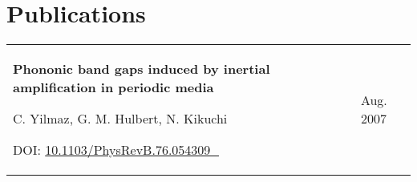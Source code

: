\documentclass[10pt, a4paper]{article}
\let\hrefWithoutArrow\href
\renewcommand{\href}[2]{\hrefWithoutArrow{#1}{#2\, \raisebox{.1ex}{\footnotesize \faExternalLink*}}}
\begin{document}
    \section{Publications}
    
        \begin{tabularx}{ cm-0.13cm}{K{0.2 cm} R{3.6 cm}}
            \textbf{Phononic band gaps induced by inertial amplification in periodic media}

            \vspace{0.06 cm}

            C. Yilmaz, G. M. Hulbert, N. Kikuchi

            \vspace{0.06 cm}

            DOI: \href{https://doi.org/10.1103/PhysRevB.76.054309}{10.1103/PhysRevB.76.054309}
            &
            Aug. 2007

        \end{tabularx}
\end{document}
